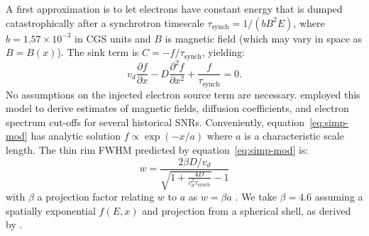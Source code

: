 \documentclass[iop, apj, numberedappendix, twocolappendix]{emulateapj}
\newcommand*{\mt}{\mathrm}
\newcommand*{\ptl}{\partial}
\newcommand*{\tsynch}{\tau_{\mt{synch}}}
\begin{document}
A first approximation is to let electrons have constant energy that is dumped
catastrophically after a synchrotron timescale $\tsynch = 1/(b B^2 E)$, where
$b = 1.57 \times 10^{-3}$ in CGS units and $B$ is magnetic field (which may
vary in space as $B=B(x)$).  The sink term is $C = -f / \tsynch$, yielding:
\begin{equation} \label{eq:simp-mod}
    v_d \frac{\ptl f}{\ptl x} - D \frac{\ptl^2 f}{\ptl x^2} +
    \frac{f}{\tau_{\mt{synch}}} = 0 .
\end{equation}
No assumptions on the injected electron source term are necessary.
\citet{parizot2006} employed this model to derive estimates of magnetic fields,
diffusion coefficients, and electron spectrum cut-offs for several historical
SNRs.  Conveniently, equation~\eqref{eq:simp-mod} has analytic solution $f
\propto \exp(-x/a)$ where $a$ is a characteristic scale length.  The thin rim
FWHM predicted by equation~\eqref{eq:simp-mod} is:
\begin{equation} \label{eq:simp-fwhm}
    w = \frac{2\beta D / v_d}{\sqrt{1 +\frac{4D}{v_d^2 \tsynch}} - 1}
\end{equation}
with $\beta$ a projection factor relating $w$ to $a$ as $w = \beta a$
\citep{berezhko2004, parizot2006}.  We take $\beta = 4.6$ assuming a spatially
exponential $f(E,x)$ and projection from a spherical shell, as derived by
\citet{ballet2006}.
\end{document}
